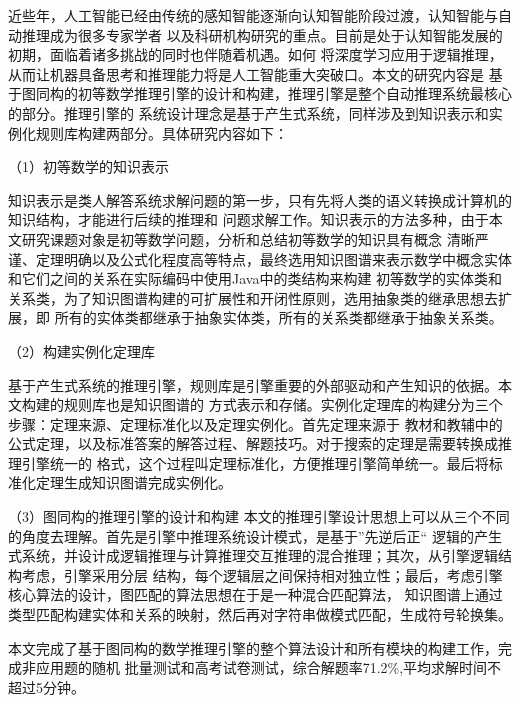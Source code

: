 \documentclass{standalone}
\begin{document}
	
\begin{chineseabstract}
近些年，人工智能已经由传统的感知智能逐渐向认知智能阶段过渡，认知智能与自动推理成为很多专家学者
以及科研机构研究的重点。目前是处于认知智能发展的初期，面临着诸多挑战的同时也伴随着机遇。如何
将深度学习应用于逻辑推理，从而让机器具备思考和推理能力将是人工智能重大突破口。本文的研究内容是
基于图同构的初等数学推理引擎的设计和构建，推理引擎是整个自动推理系统最核心的部分。推理引擎的
系统设计理念是基于产生式系统，同样涉及到知识表示和实例化规则库构建两部分。具体研究内容如下：

（1）初等数学的知识表示

知识表示是类人解答系统求解问题的第一步，只有先将人类的语义转换成计算机的知识结构，才能进行后续的推理和
问题求解工作。知识表示的方法多种，由于本文研究课题对象是初等数学问题，分析和总结初等数学的知识具有概念
清晰严谨、定理明确以及公式化程度高等特点，最终选用知识图谱来表示数学中概念实体和它们之间的关系在实际编码中使用Java中的类结构来构建
初等数学的实体类和关系类，为了知识图谱构建的可扩展性和开闭性原则，选用抽象类的继承思想去扩展，即
所有的实体类都继承于抽象实体类，所有的关系类都继承于抽象关系类。

（2）构建实例化定理库

基于产生式系统的推理引擎，规则库是引擎重要的外部驱动和产生知识的依据。本文构建的规则库也是知识图谱的
方式表示和存储。实例化定理库的构建分为三个步骤：定理来源、定理标准化以及定理实例化。首先定理来源于
教材和教辅中的公式定理，以及标准答案的解答过程、解题技巧。对于搜索的定理是需要转换成推理引擎统一的
格式，这个过程叫定理标准化，方便推理引擎简单统一。最后将标准化定理生成知识图谱完成实例化。

（3）图同构的推理引擎的设计和构建
本文的推理引擎设计思想上可以从三个不同的角度去理解。首先是引擎中推理系统设计模式，是基于”先逆后正“
逻辑的产生式系统，并设计成逻辑推理与计算推理交互推理的混合推理；其次，从引擎逻辑结构考虑，引擎采用分层
结构，每个逻辑层之间保持相对独立性；最后，考虑引擎核心算法的设计，图匹配的算法思想在于是一种混合匹配算法，
知识图谱上通过类型匹配构建实体和关系的映射，然后再对字符串做模式匹配，生成符号轮换集。

本文完成了基于图同构的数学推理引擎的整个算法设计和所有模块的构建工作，完成非应用题的随机
批量测试和高考试卷测试，综合解题率71.2\%,平均求解时间不超过5分钟。


\end{chineseabstract}
\end{document}
